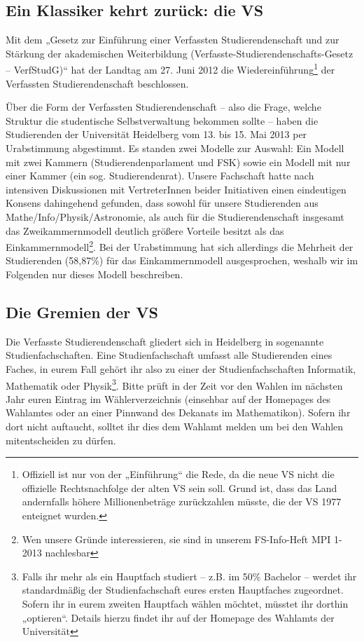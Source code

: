 \subsection{Ein Klassiker kehrt zurück: die VS}

Mit dem „Gesetz zur Einführung einer Verfassten Studierendenschaft und zur
Stärkung der akademischen Weiterbildung
(Ver\-fass\-te-Stu\-dier\-en\-den\-schafts-Ge\-setz -- VerfStudG)“ hat der
Landtag am 27. Juni 2012 die Wiedereinführung\footnote{Offiziell ist nur von
der „Einführung“ die Rede, da die neue VS nicht die offizielle Rechtsnachfolge
der alten VS sein soll.  Grund ist, dass das Land andernfalls höhere
Millionenbeträge zurückzahlen müsste, die der VS 1977 enteignet wurden.} der
Verfassten Studierendenschaft beschlossen.

Über die Form der Verfassten Studierendenschaft -- also die Frage, welche
Struktur die studentische Selbstverwaltung bekommen sollte -- haben die
Studierenden der Universität Heidelberg vom 13. bis 15. Mai 2013 per
Urabstimmung abgestimmt.  Es standen zwei Modelle zur Auswahl: Ein Modell mit
zwei Kammern (Studierendenparlament und FSK) sowie ein Modell mit nur einer
Kammer (ein sog. Studierendenrat). Unsere Fachschaft hatte nach intensiven
Diskussionen mit VertreterInnen beider Initiativen einen eindeutigen Konsens
dahingehend gefunden, dass sowohl für unsere Studierenden aus
Mathe/Info/Physik/Astronomie, als auch für die Studierendenschaft insgesamt das
Zweikammernmodell deutlich größere Vorteile besitzt als das
Einkammernmodell\footnote{Wen unsere Gründe interessieren, sie sind in unserem
FS-Info-Heft MPI 1-2013 nachlesbar}.  Bei der Urabstimmung hat sich allerdings
die Mehrheit der Studierenden (58,87\%) für das Einkammernmodell ausgesprochen,
weshalb wir im Folgenden nur dieses Modell beschreiben.

\subsection{Die Gremien der VS}

Die Verfasste Studierendenschaft gliedert sich in Heidelberg in sogenannte
Studienfachschaften. Eine Studienfachschaft umfasst alle Studierenden eines
Faches, in eurem Fall gehört ihr also zu einer der Studienfachschaften
Informatik, Mathematik oder Physik\footnote{Falls ihr mehr als ein Hauptfach
studiert -- z.B. im 50\% Bachelor -- werdet ihr standardmäßig der
Studienfachschaft eures ersten Hauptfaches zugeordnet.  Sofern ihr in eurem
zweiten Hauptfach wählen möchtet, müsstet ihr dorthin „optieren“.  Details
hierzu findet ihr auf der Homepage des Wahlamts der Universität}.  Bitte prüft
in der Zeit vor den Wahlen im nächsten Jahr euren Eintrag im Wählerverzeichnis
(einsehbar auf der Homepages des Wahlamtes oder an einer Pinnwand des Dekanats
im Mathematikon). Sofern ihr dort nicht auftaucht, solltet ihr dies dem Wahlamt
melden um bei den Wahlen mitentscheiden zu dürfen.

